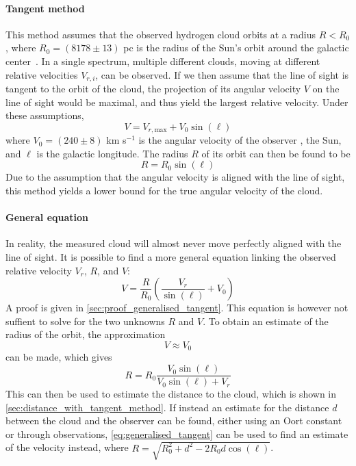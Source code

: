 \paragraph{Tangent method}
This method assumes that the observed hydrogen cloud orbits at a radius $R < R_0$, where $R_0 = (8178 \pm 13)$ pc is the radius of the Sun's orbit around the galactic \mbox{center \cite{the_gravity_collaboration_geometric_2019}.} In a single spectrum, multiple different clouds, moving at different relative velocities $V_{r,i}$, can be observed. If we then assume that the line of sight is tangent to the orbit of the cloud, the projection of its angular velocity $V$ on the line of sight would be maximal, and thus yield the largest relative velocity. Under these assumptions,
\begin{equation}
    V = V_{r,\textrm{max}} + V_0 \sin(\ell)
\end{equation}
where $V_0 = (240 \pm 8)$ {km s$^{-1}$} is the angular velocity of the observer \cite{reid_trigonometric_2014}, the Sun, and $\ell$ is the galactic longitude. The radius $R$ of its orbit can then be found to be
\begin{equation}
    R = R_0 \sin(\ell)
\end{equation}
Due to the assumption that the angular velocity is aligned with the line of sight, this method yields a lower bound for the true angular velocity of the cloud.

\paragraph{General equation}
In reality, the measured cloud will almost never move perfectly aligned with the line of sight. It is possible to find a more general equation linking the observed relative velocity $V_r$, $R$, and $V$:
\begin{equation}
    V = \frac{R}{R_0} \left( \frac{V_r}{\sin(\ell)} + V_0 \right)
    \label{eq:generalised_tangent}
\end{equation}
A proof is given in \autoref{sec:proof_generalised_tangent}. This equation is however not suffient to solve for the two unknowns $R$ and $V$. To obtain an estimate of the radius of the orbit, the approximation
\begin{equation}
    V \approx V_0
\end{equation}
can be made, which gives
\begin{equation} \label{eq:general_radius}
    R = R_0 \frac{V_0 \sin(\ell)}{V_0 \sin(\ell) + V_r}
\end{equation}
This can then be used to estimate the distance to the cloud, which is shown in \autoref{sec:distance_with_tangent_method}.
If instead an estimate for the distance $d$ between the cloud and the observer can be found, either using an Oort constant or through observations, \autoref{eq:generalised_tangent} can be used to find an estimate of the velocity instead, where $R = \sqrt{R_0^2 + d^2 - 2 R_0 d \cos(\ell)}$.

